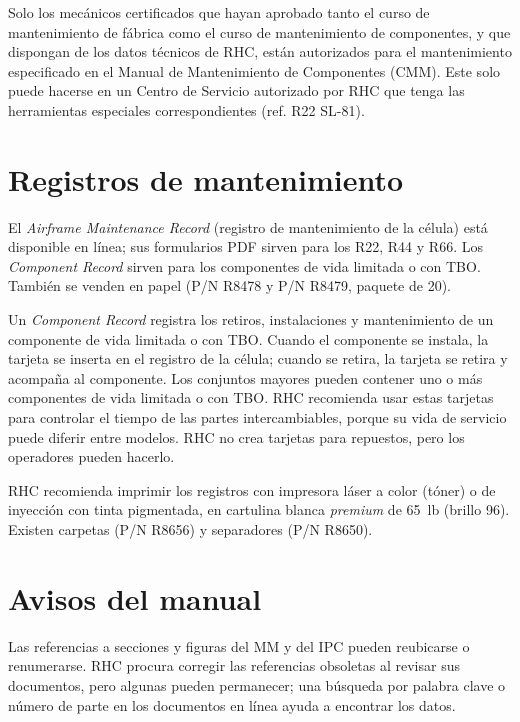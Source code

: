 Solo los mecánicos certificados que hayan aprobado tanto el curso de mantenimiento de fábrica como el curso de mantenimiento de componentes, y que dispongan de los datos técnicos de RHC, están autorizados para el mantenimiento especificado en el Manual de Mantenimiento de Componentes (CMM). Este solo puede hacerse en un Centro de Servicio autorizado por RHC que tenga las herramientas especiales correspondientes (ref. R22 SL-81).

\section{Registros de mantenimiento}

El \emph{Airframe Maintenance Record} (registro de mantenimiento de la célula) está disponible en línea; sus formularios PDF sirven para los R22, R44 y R66. Los \emph{Component Record} sirven para los componentes de vida limitada o con TBO. También se venden en papel (P/N R8478 y P/N R8479, paquete de 20).

Un \emph{Component Record} registra los retiros, instalaciones y mantenimiento de un componente de vida limitada o con TBO. Cuando el componente se instala, la tarjeta se inserta en el registro de la célula; cuando se retira, la tarjeta se retira y acompaña al componente. Los conjuntos mayores pueden contener uno o más componentes de vida limitada o con TBO. RHC recomienda usar estas tarjetas para controlar el tiempo de las partes intercambiables, porque su vida de servicio puede diferir entre modelos. RHC no crea tarjetas para repuestos, pero los operadores pueden hacerlo.

RHC recomienda imprimir los registros con impresora láser a color (tóner) o de inyección con tinta pigmentada, en cartulina blanca \emph{premium} de 65~lb (brillo 96). Existen carpetas (P/N R8656) y separadores (P/N R8650).

\section{Avisos del manual}

\begin{checklist}
\end{checklist}

Las referencias a secciones y figuras del MM y del IPC pueden reubicarse o renumerarse. RHC procura corregir las referencias obsoletas al revisar sus documentos, pero algunas pueden permanecer; una búsqueda por palabra clave o número de parte en los documentos en línea ayuda a encontrar los datos.

